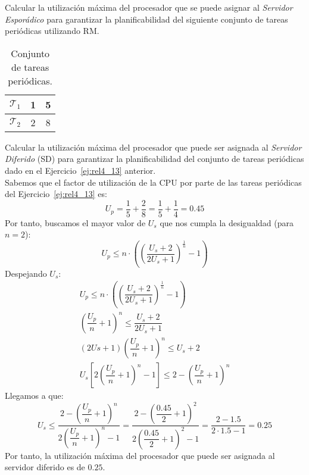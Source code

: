 \begin{ejercicio}\label{ej:rel4_13}
    Calcular la utilización máxima del procesador que se puede asignar al \textit{Servidor Esporádico} para garantizar la planificabilidad del siguiente conjunto de tareas periódicas utilizando RM.
    \begin{table}[H]
    \centering
    \begin{tabular}{|c|c|c|}
        \hline
        $\mathcal{T}_1$ & 1 & 5 \\
        \hline
        $\mathcal{T}_2$ & 2 & 8 \\
        \hline
    \end{tabular}
    \caption{Conjunto de tareas periódicas.}
    \label{tab:4_13}
    \end{table}
\end{ejercicio}

\begin{ejercicio}\label{ej:rel4_14}
    Calcular la utilización máxima del procesador que puede ser asignada al \textit{Servidor Diferido} (SD) para garantizar la planificabilidad del conjunto de tareas periódicas dado en el Ejercicio~\ref{ej:rel4_13} anterior.\\

    Sabemos que el factor de utilización de la CPU por parte de las tareas periódicas del Ejercicio~\ref{ej:rel4_13} es:
    \begin{equation*}
        U_p = \dfrac{1}{5} + \dfrac{2}{8} = \dfrac{1}{5} + \dfrac{1}{4} = 0.45
    \end{equation*}
    Por tanto, buscamos el mayor valor de $U_s$ que nos cumpla la desigualdad (para $n=2$):
    \begin{equation*}
        U_p \leq n\cdot \left({\left(\dfrac{U_s+2}{2U_s+1}\right)}^{\frac{1}{n}}-1\right)
    \end{equation*}
    Despejando $U_s$:
    \begin{gather*}
        U_p \leq n\cdot \left({\left(\dfrac{U_s+2}{2U_s+1}\right)}^{\frac{1}{n}}-1\right) \\
        {\left(\dfrac{U_p}{n}+1\right)}^{n} \leq \dfrac{U_s+2}{2U_s+1} \\
        (2Us+1){\left(\dfrac{U_p}{n}+1\right)}^{n} \leq U_s+2 \\
        U_s\left[2{\left(\dfrac{U_p}{n}+1\right)}^{n}-1\right] \leq 2-{\left(\dfrac{U_p}{n}+1\right)}^{n} 
    \end{gather*}
    Llegamos a que:
    \begin{equation*}
        U_s \leq \dfrac{2-{\left(\dfrac{U_p}{n}+1\right)}^{n}}{2{\left(\dfrac{U_p}{n}+1\right)}^{n}-1} = \dfrac{2-{\left(\dfrac{0.45}{2}+1\right)}^{2}}{2{\left(\dfrac{0.45}{2}+1\right)}^{2}-1} = \dfrac{2-1.5}{2\cdot 1.5-1} = 0.25
    \end{equation*}
    Por tanto, la utilización máxima del procesador que puede ser asignada al servidor diferido es de $0.25$.
\end{ejercicio}


